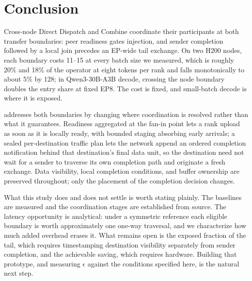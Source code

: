 \section{Conclusion}
Cross-node Direct Dispatch and Combine coordinate their participants at both transfer
boundaries: peer readiness gates injection, and sender completion followed by a local
join precedes an EP-wide tail exchange. On two H200 nodes, each boundary costs
11--15\us{} at every batch size we measured, which is roughly 20\% and 18\% of the
operator at eight tokens per rank and falls monotonically to about 5\% by 128; in
Qwen3-30B-A3B decode, crossing the node boundary doubles the entry share at fixed EP8. The cost is fixed, and small-batch
decode is where it is exposed.

\sys{} addresses both boundaries by changing where coordination is resolved rather than
what it guarantees. Readiness aggregated at the fan-in point lets a rank upload as soon
as it is locally ready, with bounded staging absorbing early arrivals; a sealed
per-destination traffic plan lets the network append an ordered completion notification
behind that destination's final data unit, so the destination need not wait for a sender
to traverse its own completion path and originate a fresh exchange. Data visibility,
local completion conditions, and buffer ownership are preserved throughout; only the
placement of the completion decision changes.

What this study does and does not settle is worth stating plainly. The baselines are
measured and the coordination stages are established from source. The latency
opportunity is analytical: under a symmetric reference each eligible boundary is worth
approximately one one-way traversal, and we characterize how much added overhead erases
it. What remains open is the exposed fraction of the tail, which requires timestamping
destination visibility separately from sender completion, and the achievable saving,
which requires hardware. Building that prototype, and measuring $\epsilon$ against the
conditions specified here, is the natural next step.
